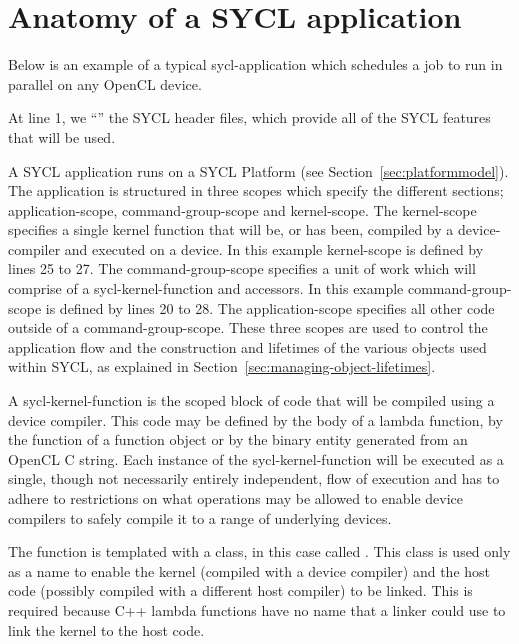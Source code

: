 \newpage
\section{Anatomy of a SYCL application}

Below is an example of a typical \gls{sycl-application} which schedules a job to run
in parallel on any OpenCL device.

\lstset{
         numbers=left,
         stepnumber=1,
         numberfirstline=false
 }


At line 1, we ``'' the SYCL header files, which
provide all of the SYCL features that will be used.

A SYCL application runs on a SYCL Platform (see Section~\ref{sec:platformmodel}).
The application is structured in three scopes which specify the different sections;
\gls{application-scope}, \gls{command-group-scope} and \gls{kernel-scope}.
The \gls{kernel-scope} specifies a single kernel function that will
be, or has been, compiled by a \gls{device-compiler} and executed on a
\gls{device}. In this example \gls{kernel-scope} is defined by lines
25 to 27.  The \gls{command-group-scope} specifies a unit of work which will
comprise of a \gls{sycl-kernel-function} and \glspl{accessor}.  In this
example \gls{command-group-scope} is defined by lines 20 to 28.  The
\gls{application-scope} specifies all other code outside of a
\gls{command-group-scope}.  
These three scopes are used to control the
application flow and the construction and lifetimes of the various objects used
within SYCL, as explained in Section~\ref{sec:managing-object-lifetimes}.

A \gls{sycl-kernel-function} is the scoped block of code that will be
compiled using a device compiler.  This code may be defined by the
body of a lambda function, by the  function of
a function object or by the binary  entity
generated from an OpenCL C string.  Each instance of the
\gls{sycl-kernel-function} will be executed as a single, though not
necessarily entirely independent, flow of execution and has to adhere
to restrictions on what operations may be allowed to enable device
compilers to safely compile it to a range of underlying devices.

The  function is templated with a class, in this case
called . This class is used only as a name to
enable the kernel (compiled with a device compiler) and the host code (possibly
compiled with a different host compiler) to be linked. This is required
because C++ lambda functions have no name that a linker could use to link the
kernel to the host code.

